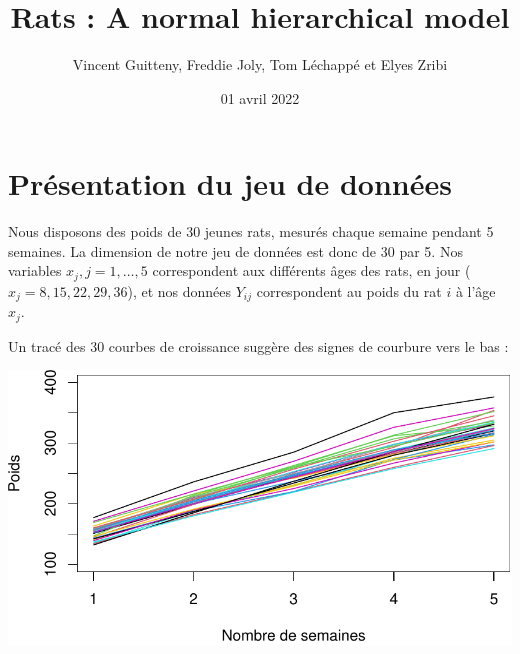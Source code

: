 \documentclass[
]{article}
\title{Rats : A normal hierarchical model}
\author{Vincent Guitteny, Freddie Joly, Tom Léchappé et Elyes Zribi}
\date{01 avril 2022}
\begin{document}
\maketitle

\newenvironment{cols}[1][]{}{}
\newenvironment{col}[1]{\begin{minipage}{#1}\ignorespaces}{%
\end{minipage}
\ifhmode\unskip\fi
\aftergroup\useignorespacesandallpars}
\def\useignorespacesandallpars#1\ignorespaces\fi{%
#1\fi\ignorespacesandallpars}
\makeatletter
\def\ignorespacesandallpars{%
  \@ifnextchar\par
    {\expandafter\ignorespacesandallpars\@gobble}%
    {}%
}
\makeatother

\renewcommand\contentsname{Table des matières}
\newpage
\tableofcontents
\newpage

\hypertarget{pruxe9sentation-du-jeu-de-donnuxe9es}{%
\section{Présentation du jeu de
données}\label{pruxe9sentation-du-jeu-de-donnuxe9es}}

Nous disposons des poids de 30 jeunes rats, mesurés chaque semaine
pendant 5 semaines. La dimension de notre jeu de données est donc de 30
par 5. Nos variables \(x_j,j=1,…,5\) correspondent aux différents âges
des rats, en jour (\(x_j = {8,15,22,29,36}\)), et nos données \(Y_{ij}\)
correspondent au poids du rat \(i\) à l'âge \(x_j\).

Un tracé des 30 courbes de croissance suggère des signes de courbure
vers le bas :

\begin{center}\includegraphics{Rats---A-normal-hierarchical-model_files/figure-latex/unnamed-chunk-1-1} \end{center}
\end{document}
